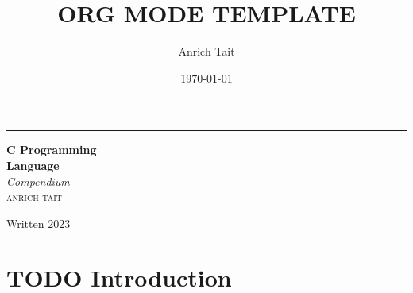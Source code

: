 \documentclass[a4paper]{article}
\author{Anrich Tait}
\date{\today}
\title{ORG MODE TEMPLATE}
\begin{document}

\newcommand*{\plogo}{\fbox{$\mathcal{PL}$}} %





\begin{titlepage} %
	
	\raggedleft %
	
	\rule{1pt}{\textheight} %
	\hspace{0.05\textwidth} %
	\parbox[b]{0.75\textwidth}{ %
		
		{\Huge\bfseries C Programming \\[0.5\baselineskip] Language}\\[2\baselineskip] %
		{\large\textit{Compendium }}\\[4\baselineskip] %
		{\Large\textsc{anrich tait}} %
		
		\vspace{0.5\textheight} %
		
		{\noindent Written 2023}\\[\baselineskip] %
	}


\end{titlepage}

\tableofcontents
\newpage

\section{{\bfseries\sffamily TODO} Introduction}
\label{sec:org256dd14}
\end{document}
